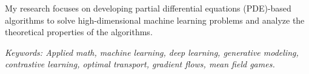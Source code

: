 

\begin{cvparagraph}


My research focuses on developing partial differential equations (PDE)-based algorithms to solve high-dimensional machine learning problems and analyze the theoretical properties of the algorithms.

\textit{Keywords: Applied math, machine learning, deep learning, generative modeling, contrastive learning, optimal transport, gradient flows, mean field games.}

\end{cvparagraph}